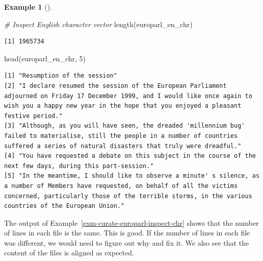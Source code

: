 \documentclass[
  letterpaper,
  krantz1]{latex/krantz-mod}
\newenvironment{Shaded}{\begin{snugshade}}{\end{snugshade}}
\newcommand{\CommentTok}[1]{\textcolor[rgb]{0.00,0.00,0.00}{\textit{#1}}}
\newcommand{\DecValTok}[1]{\textcolor[rgb]{0.00,0.00,0.00}{#1}}
\newcommand{\FunctionTok}[1]{\textcolor[rgb]{0.00,0.00,0.00}{#1}}
\newcommand{\NormalTok}[1]{\textcolor[rgb]{0.00,0.00,0.00}{#1}}
\theoremstyle{definition}
\newtheorem{example}{Example}[chapter]
\theoremstyle{definition}
\theoremstyle{remark}
\begin{document}
\begin{example}[]
\begin{Shaded}
\begin{Highlighting}[numbers=left,,]
\CommentTok{\# Inspect English character vector}
\FunctionTok{length}\NormalTok{(europarl\_en\_chr)}
\end{Highlighting}
\end{Shaded}

\begin{verbatim}
[1] 1965734
\end{verbatim}

\begin{Shaded}
\begin{Highlighting}[numbers=left,,]
\FunctionTok{head}\NormalTok{(europarl\_en\_chr, }\DecValTok{5}\NormalTok{)}
\end{Highlighting}
\end{Shaded}

\begin{verbatim}
[1] "Resumption of the session"                                                                                                                                                                                                               
[2] "I declare resumed the session of the European Parliament adjourned on Friday 17 December 1999, and I would like once again to wish you a happy new year in the hope that you enjoyed a pleasant festive period."                         
[3] "Although, as you will have seen, the dreaded 'millennium bug' failed to materialise, still the people in a number of countries suffered a series of natural disasters that truly were dreadful."                                         
[4] "You have requested a debate on this subject in the course of the next few days, during this part-session."                                                                                                                               
[5] "In the meantime, I should like to observe a minute' s silence, as a number of Members have requested, on behalf of all the victims concerned, particularly those of the terrible storms, in the various countries of the European Union."
\end{verbatim}

\end{example}

The output of Example~\ref{exm-curate-europarl-inspect-chr} shows that
the number of lines in each file is the same. This is good. If the
number of lines in each file was different, we would need to figure out
why and fix it. We also see that the content of the files is aligned as
expected.
\end{document}
